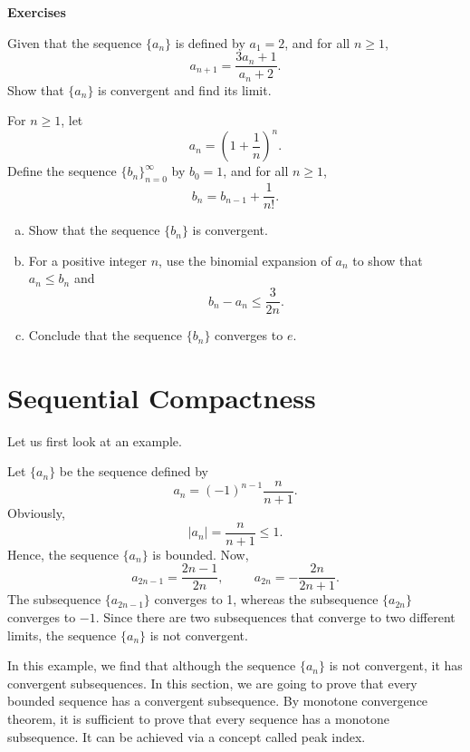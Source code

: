 \vp
\noindent
{\bf \large Exercises  \thesection}
\setcounter{myquestion}{1}


 \begin{question}{\themyquestion} 
Given that the sequence $\{a_n\}$ is defined by $a_1=2$, and for all $n\geq 1$,
\[a_{n+1}=\frac{3a_n+1}{a_n+2}.\]
Show that $\{a_n\}$ is convergent and find its limit.
\end{question}
\atc

 \begin{question}{\themyquestion} 
 For $n\geq 1$, let
\[a_n=\left(1+\frac{1}{n}\right)^n.\]
Define the sequence $\{b_n\}_{n=0}^{\infty}$ by $b_0=1$, and for all $n\geq 1$,
\[b_n=b_{n-1}+\frac{1}{n!}.\]

\begin{enumerate}[(a)]
\item Show that the sequence $\{b_n\}$ is convergent.
\item For a positive integer $n$, use the binomial expansion of $a_n$ to show that 
$a_n\leq b_n$ and 
\[b_n-a_n\leq\frac{3}{2n}.\]
\item Conclude that the sequence $\{b_n\}$ converges to $e$.
\end{enumerate}
 
\end{question}
\vp
\section{Sequential Compactness}\label{sec1.8}

Let us first look at an example.
 \begin{example}{}
 Let $\{a_n\}$ be the sequence defined by
 \[a_n=(-1)^{n-1}\frac{n}{n+1}.\]
 Obviously,
 \[|a_n|=\frac{n}{n+1}\leq 1.\] 
 Hence, the sequence $\{a_n\}$ is bounded. 
 Now,
 \[a_{2n-1}=\frac{2n-1}{2n},\hspace{1cm}a_{2n}=-\frac{2n}{2n+1}.\]
 The subsequence $\{a_{2n-1}\}$ converges to 1, whereas the subsequence $\{a_{2n}\}$ converges to $-1$. Since there are two subsequences that converge to two different limits,
 the sequence $\{a_n\}$ is not convergent.
 
 \end{example}
In this example, we find that although the sequence $\{a_n\}$ is not convergent, it has convergent subsequences.
 In this section, we are going to  prove that every bounded sequence has a convergent subsequence.
By monotone convergence theorem, it is sufficient to prove that every sequence has a monotone subsequence. It can be achieved via a concept called peak index.
 
